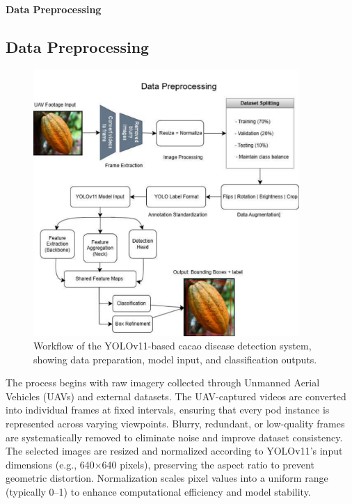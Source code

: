 \noindent \textbf{Data Preprocessing}
\subsection*{Data Preprocessing}


\begin{figure}[H]
	\centering
	\caption{Workflow of the YOLOv11-based cacao disease detection system, showing data preparation, model input, and classification outputs.}
	\label{fig:Data Preprocessing Workflow}
	\includegraphics[width=0.9\textwidth]{figures/Data Processing.pdf}
\end{figure}

The process begins with raw imagery collected through Unmanned Aerial Vehicles (UAVs) and external datasets. The UAV-captured videos are converted into individual frames at fixed intervals, ensuring that every pod instance is represented across varying viewpoints. Blurry, redundant, or low-quality frames are systematically removed to eliminate noise and improve dataset consistency. The selected images are resized and normalized according to YOLOv11’s input dimensions (e.g., 640×640 pixels), preserving the aspect ratio to prevent geometric distortion. Normalization scales pixel values into a uniform range (typically 0–1) to enhance computational efficiency and model stability.

